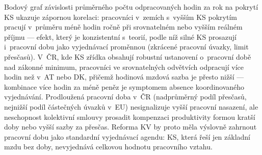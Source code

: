 Bodový graf závislosti průměrného počtu odpracovaných hodin za rok na pokrytí \ac{KS} ukazuje zápornou korelaci: pracovníci v~zemích s~vyšším \ac{KS} pokrytím pracují v~průměru méně hodin ročně při srovnatelném nebo vyšším reálném příjmu --- efekt, který je konzistentní s~teorií, podle níž silné \ac{KS} prosazují i~pracovní dobu jako vyjednávací proměnnou (zkrácené pracovní úvazky, limit přesčasů).
V~ČR, kde \ac{KS} zřídka obsahují robustní ustanovení o~pracovní době nad zákonné minimum, pracovníci ve srovnatelných odvětvích odpracují více hodin než v~AT nebo DK, přičemž hodinová mzdová sazba je přesto nižší --- kombinace více hodin za méně peněz je symptomem absence koordinovaného vyjednávání.
Prodloužená pracovní doba v~ČR (nadprůměrný podíl přesčasů, nejnižší podíl částečných úvazků v~\ac{EU}) nesignalizuje vyšší pracovní nasazení, ale neschopnost kolektivní smlouvy prosadit kompenzaci produktivity formou kratší doby nebo vyšší sazby za přesčas.
Reforma \ac{KV} by proto měla výslovně zahrnout pracovní dobu jako standardní vyjednávací agendu: \ac{KS}, která řeší jen základní mzdu bez doby, nevyjednává celkovou hodnotu pracovního vztahu.


